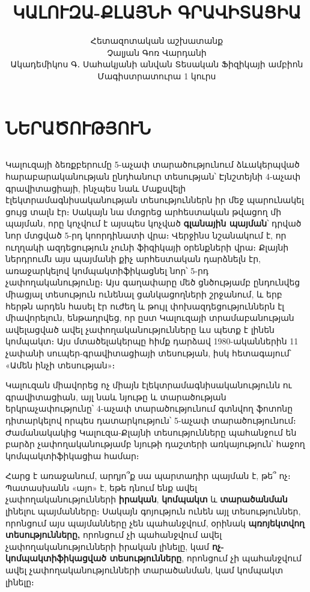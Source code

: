 \documentclass[12pt,a4paper]{article}
\date{}
\begin{document}
\title{ԿԱԼՈՒԶԱ-ՔԼԱՅՆԻ ԳՐԱՎԻՏԱՑԻԱ}
\author{Հետազոտական աշխատանք\\
Չալյան Գոռ Վարդանի\\
Ակադեմիկոս Գ․ Սահակյանի անվան Տեսական Ֆիզիկայի ամբիոն\\
Մագիստրատուրա 1 կուրս}

\maketitle
\thispagestyle{empty}

\newpage

\section{ՆԵՐԱԾՈՒԹՅՈՒՆ}

$\;$

Կալուզայի ձեռքբերումը 5-աչափ տարածությունում ձևակերպված հարաբարականության
ընդհանուր տեսության՝ Էյնշտեյնի 4-աչափ գրավիտացիայի, ինչպես նաև Մաքսվելի
էլեկտրամագնիսականության տեսություններն իր մեջ պարունակել ցույց տալն
էր։ Սակայն նա մտցրեց արհեստական թվացող մի պայման, որը կոչվում է այսպես
կոչված \textbf{գլանային պայման}՝ դրված նոր մտցված 5-րդ կոորդինատի
վրա։ Վերջինս նշանակում է, որ ուղղակի ազդեցություն չունի ֆիզիկայի օրենքների
վրա։ Քլայնի ներդրումն այս պայմանի քիչ արհեստական դարձնելն էր, առաջարկելով
կոմպակտիֆիկացնել նոր՝ 5-րդ չափողականությունը։ Այս գաղափարը մեծ ցնծությամբ
ընդունվեց միացյալ տեսություն ունենալ ցանկացողների շրջանում, և երբ
հերթն արդեն հասել էր ուժեղ և թույլ փոխազդեցություններն էլ միավորելուն,
ենթադրվեց, որ ըստ Կալուզայի տրամաբանության ավելացված ավել չափողականությունները
ևս պետք է լինեն կոմպակտ։ Այս մտածելակերպը հիմք դարձավ 1980-ականներին
11 չափանի սուպեր-գրավիտացիայի տեսության, իսկ հետագայում՝ «Ամեն ինչի
տեսության»։

Կալուզան միավորեց ոչ միայն էլեկտրամագնիսականությունն ու գրավիտացիան,
այլ նաև նյութը և տարածության երկրաչափությունը՝ 4-աչափ տարածությունում
գտնվող ֆոտոնը դիտարկելով որպես դատարկություն՝ 5-աչափ տարածությունում։
Ժամանակակից Կալուզա-Քլայնի տեսությունները պահանջում են բարձր չափողականությամբ
նյութի դաշտերի առկայություն՝ հաջող կոմպակտիֆիկացիա համար։ 

Հարց է առաջանում, արդյո՞ք սա պարտադիր պայման է, թե՞ ոչ։ Պատասխանն
«այո» է, եթե դնում ենք ավել չափողականությունների \textbf{իրական},
\textbf{կոմպակտ} և \textbf{տարածանման} լինելու պայմանները։ Սակայն
գոյություն ունեն այլ տեսություններ, որոնցում այս պայմանները չեն պահանջվում,
օրինակ \textbf{պռոյեկտվող տեսությունները,} որոնցում չի պահանջվում
ավել չափողականությունների իրական լինելը, կամ \textbf{ոչ-կոմպակտիֆիկացված
տեսությունները}, որոնցում չի պահանջվում ավել չափողականությունների
տարածանման, կամ կոմպակտ լինելը։
\end{document}
